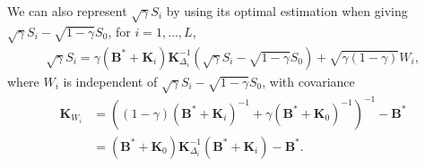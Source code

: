\documentclass[journal,final, onecolumn]{IEEEtran}
\begin{document}
We can also represent $\sqrt{\gamma}S_i$ by using its optimal estimation when giving $\sqrt{\gamma}S_{i} - \sqrt{1-\gamma}S_{0}$, for $i=1,\ldots,L$,
\begin{align}
\sqrt{\gamma} S_i = \gamma (\boldsymbol{B}^{*} + \boldsymbol{K}_{i}) \boldsymbol{K}_{\Delta_{i}}^{-1}\left(    \sqrt{\gamma}S_{i} - \sqrt{1-\gamma}S_{0}  \right) + \sqrt{\gamma (1-\gamma)} W_{i} ,\label{eq:CW}
\end{align}
where $W_{i}$ is independent of $\sqrt{\gamma}S_{i} - \sqrt{1-\gamma}S_{0}$, with covariance
\begin{align}
\boldsymbol{K}_{W_{i}} &=\left(   {(1-\gamma)}(\boldsymbol{B}^{*} + \boldsymbol{K}_{i})^{-1} +  \gamma (\boldsymbol{B}^{*} + \boldsymbol{K}_{0})^{-1}           \right)^{-1} - \boldsymbol{B}^{*}\\
  &=(\boldsymbol{B}^{*} + \boldsymbol{K}_{0}) \boldsymbol{K}^{-1}_{\Delta_{i}}(\boldsymbol{B}^{*} + \boldsymbol{K}_{i}) - \boldsymbol{B}^{*}. \label{eq:CKW3}
\end{align}
\end{document}
